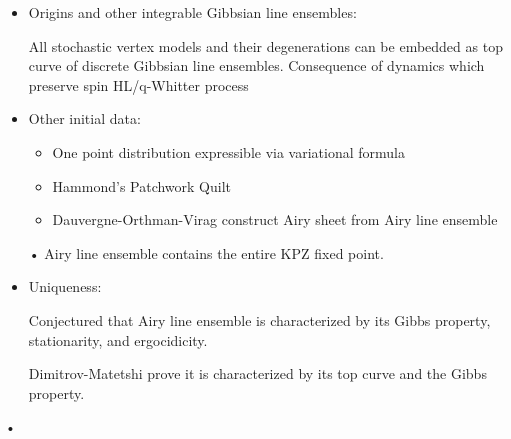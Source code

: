 \begin{itemize}
\item
Origins and other integrable Gibbsian line ensembles:

All stochastic vertex models and their degenerations can be embedded as top curve of discrete Gibbsian line ensembles. Consequence of dynamics which preserve spin HL/q-Whitter process
\item
Other initial data:
\begin{itemize}
\item
One point distribution expressible via variational formula
\item
Hammond's Patchwork Quilt
\item
Dauvergne-Orthman-Virag construct Airy sheet from Airy line ensemble
\end{itemize}•
Airy line ensemble contains the entire KPZ fixed point.
\item
Uniqueness:

Conjectured that Airy line ensemble is characterized by its Gibbs property, stationarity, and ergocidicity.

Dimitrov-Matetshi prove it is characterized by its top curve and the Gibbs property.
\end{itemize}•





